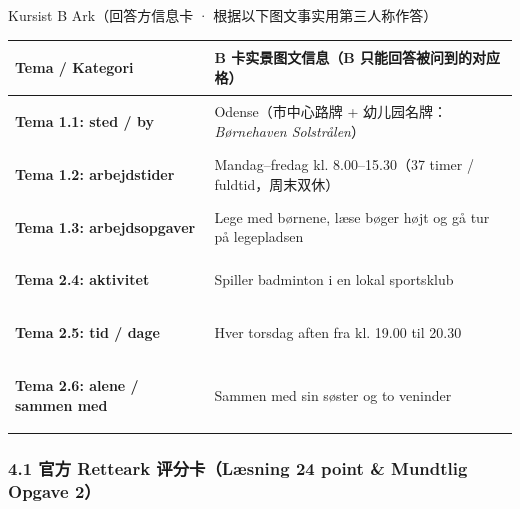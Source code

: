 \begin{emailbox}{Kursist B Ark（回答方信息卡 · 根据以下图文事实用第三人称作答）}
\small
\renewcommand{\arraystretch}{1.32}
\begin{tabularx}{\linewidth}{@{} >{\leavevmode\bfseries\color{NCDNavy}\raggedright\arraybackslash}p{4.8cm} >{\raggedright\arraybackslash}X @{}}
\toprule
\textbf{Tema / Kategori} & \textbf{B 卡实景图文信息（B 只能回答被问到的对应格）} \\
\midrule
\textbf{Tema 1.1: sted / by} & Odense（市中心路牌 + 幼儿园名牌：\textit{Børnehaven Solstrålen}） \\
\textbf{Tema 1.2: arbejdstider} & Mandag--fredag kl. 8.00--15.30（37 timer / fuldtid，周末双休） \\
\textbf{Tema 1.3: arbejdsopgaver} & Lege med børnene, læse bøger højt og gå tur på legepladsen \\
\midrule
\textbf{Tema 2.4: aktivitet} & Spiller badminton i en lokal sportsklub \\
\textbf{Tema 2.5: tid / dage} & Hver torsdag aften fra kl. 19.00 til 20.30 \\
\textbf{Tema 2.6: alene / sammen med} & Sammen med sin søster og to veninder \\
\bottomrule
\end{tabularx}
\end{emailbox}


\subsubsection*{4.1 官方 Retteark 评分卡（Læsning 24 point \& Mundtlig Opgave 2）}

